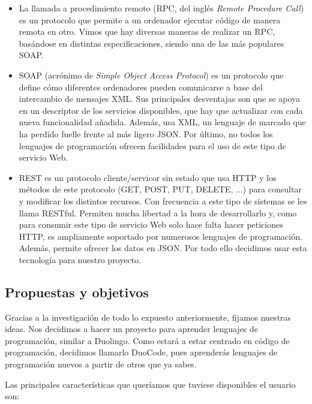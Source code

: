 \begin{itemize}
\item
La llamada a procedimiento remoto (RPC, del inglés \emph{Remote Procedure Call}) es un protocolo que permite a un ordenador ejecutar código de manera remota en otro. Vimos que hay diversas maneras de realizar un RPC, basándose en distintas especificaciones, siendo una de las más populares SOAP.

\item
SOAP (acrónimo de \emph{Simple Object Access Protocol}) es un protocolo que define cómo diferentes ordenadores pueden comunicarse a base del intercambio de mensajes XML. Sus principales desventajas son que se apoya en un descriptor de los servicios disponibles, que hay que actualizar con cada nueva funcionalidad añadida. Además, usa XML, un lenguaje de marcado que ha perdido fuelle frente al más ligero JSON. Por último, no todos los lenguajes de programación ofrecen facilidades para el uso de este tipo de servicio Web.

\item
REST es un protocolo cliente/servicor sin estado que usa HTTP y los métodos de este protocolo (GET, POST, PUT, DELETE, ...) para consultar y modificar los distintos recursos. Con frecuencia a este tipo de sistemas se les llama RESTful. Permiten mucha libertad a la hora de desarrollarlo y, como para consumir este tipo de servicio Web solo hace falta hacer peticiones HTTP, es ampliamente soportado por numerosos lenguajes de programación. Además, permite ofrecer los datos en JSON. Por todo ello decidimos usar esta tecnología para nuestro proyecto.

\end{itemize}

\subsection{Propuestas y objetivos\label{subsec:introduction}}

Gracias a la investigación de todo lo expuesto anteriormente, fijamos nuestras ideas. Nos decidimos a hacer un proyecto para aprender lenguajes de programación, similar a Duolingo. Como estará a estar centrado en código de programación, decidimos llamarlo DuoCode, pues aprenderás lenguajes de programación nuevos a partir de otros que ya sabes. 

Las principales características que queríamos que tuviese disponibles el usuario son:

